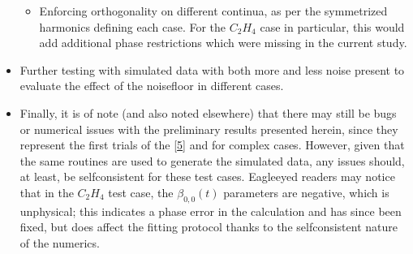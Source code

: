 \documentclass[letterpaper,table,10pt,english]{jupyterBook}
\begin{document}
\begin{itemize}
\begin{itemize}
\item {} 
\sphinxAtStartPar
Enforcing orthogonality on different continua, as per the symmetrized harmonics defining each case. For the \(C_2H_4\) case in particular, this would add additional phase restrictions which were missing in the current study.

\end{itemize}

\item {} 
\sphinxAtStartPar
Further testing with simulated data with both more and less noise present to evaluate the effect of the noise\sphinxhyphen{}floor in different cases.

\item {} 
\sphinxAtStartPar
Finally, it is of note (and also noted elsewhere) that there may still be bugs or numerical issues with the preliminary results presented herein, since they represent the first trials of the  {[}\hyperlink{cite.backmatter/bibliography:id682}{5}{]} and {\hyperref[\detokenize{backmatter/glossary:term-bootstrap-retrieval-protocol}]{}} for complex cases. However, given that the same routines are used to generate the simulated data, any issues should, at least, be self\sphinxhyphen{}consistent for these test cases. Eagle\sphinxhyphen{}eyed readers may notice that in the \(C_2H_4\) test case, the \(\beta_{0,0}(t)\) parameters are negative, which is unphysical; this indicates a phase error in the calculation and has since been fixed, but does  affect the fitting protocol thanks to the self\sphinxhyphen{}consistent nature of the numerics.

\end{itemize}
\end{document}
